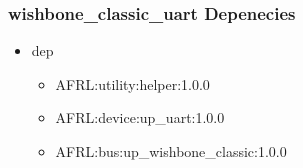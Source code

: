 \subsubsection{wishbone\_classic\_uart Depenecies}
\begin{itemize}
\item dep
	\begin{itemize}
	\item AFRL:utility:helper:1.0.0
	\item AFRL:device:up\_uart:1.0.0
	\item AFRL:bus:up\_wishbone\_classic:1.0.0
	\end{itemize}
\end{itemize}
